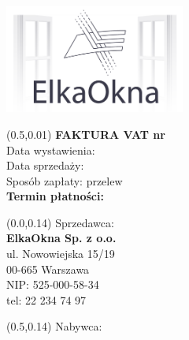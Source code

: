 \documentclass[10pt, oneside, final]{report}
\newcommand{\heightA}{0.14}
\begin{document}
\includegraphics[width=16em]{logo.png}\\

\begin{textblock}{0.4}(0.5,0.01)
	\large
	\textbf{FAKTURA VAT nr \invoiceNumber}\vspace{0.1em}\\
	\normalsize
	Data wystawienia: \dateInvoice\\
	Data sprzedaży: \dateSold\\
	Sposób zapłaty: przelew\vspace{0.2em}\\
	\textbf{Termin płatności: \datePayment}
\end{textblock}

\begin{textblock}{0.4}(0.0,\heightA)
	Sprzedawca:\vspace{0.2em}\\
	\textbf{ElkaOkna Sp. z o.o.}\\
	ul. Nowowiejska 15/19\\
	00-665 Warszawa\\
	NIP: 525-000-58-34\\
	tel: 22 234 74 97
\end{textblock}

\begin{textblock}{0.4}(0.5,\heightA)
	Nabywca:\vspace{0.2em}\\
	\textbf{\lineA}\\
	\lineB\\
	\lineC\\
	\lineD\\
	\lineE
\end{textblock}
\end{document}
